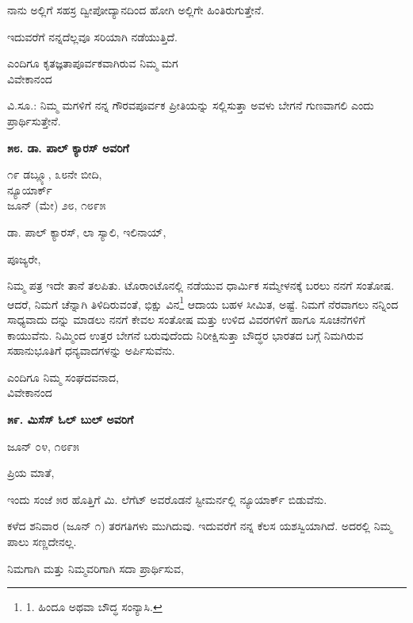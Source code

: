 ನಾನು ಅಲ್ಲಿಗೆ ಸಹಸ್ರ ದ್ವೀಪೋದ್ಯಾನದಿಂದ ಹೋಗಿ ಅಲ್ಲಿಗೇ ಹಿಂತಿರುಗುತ್ತೇನೆ.

ಇದುವರೆಗೆ ನನ್ನದೆಲ್ಲವೂ ಸರಿಯಾಗಿ ನಡೆಯುತ್ತಿದೆ.

\begin{flushright}
ಎಂದಿಗೂ ಕೃತಜ್ಞತಾಪೂರ್ವಕವಾಗಿರುವ ನಿಮ್ಮ ಮಗ\\ವಿವೇಕಾನಂದ
\end{flushright}

ವಿ.ಸೂ.: ನಿಮ್ಮ ಮಗಳಿಗೆ ನನ್ನ ಗೌರವಪೂರ್ವಕ ಪ್ರೀತಿಯನ್ನು ಸಲ್ಲಿಸುತ್ತಾ ಅವಳು ಬೇಗನೆ ಗುಣವಾಗಲಿ ಎಂದು ಪ್ರಾರ್ಥಿಸುತ್ತೇನೆ.

\begin{center}
\textbf{೫೮. ಡಾ. ಪಾಲ್ ಕ್ಯಾರಸ್ ಅವರಿಗೆ}
\end{center}

\begin{flushright}
೧೯ ಡಬ್ಲ್ಯೂ, ೩೮ನೇ ಬೀದಿ,\\ನ್ಯೂಯಾರ್ಕ್\\ಜೂನ್ (ಮೇ) ೨೮, ೧೮೯೫
\end{flushright}

ಡಾ. ಪಾಲ್ ಕ್ಯಾರಸ್, ಲಾ ಸ್ಯಾಲಿ, ಇಲಿನಾಯ್​,

ಪೂಜ್ಯರೇ,

ನಿಮ್ಮ ಪತ್ರ ಇದೇ ತಾನೆ ತಲಪಿತು. ಟೊರಾಂಟೊನಲ್ಲಿ ನಡೆಯುವ ಧಾರ್ಮಿಕ ಸಮ್ಮೇಳನಕ್ಕೆ ಬರಲು ನನಗೆ ಸಂತೋಷ. ಆದರೆ, ನಿಮಗೆ ಚೆನ್ನಾಗಿ ತಿಳಿದಿರುವಂತೆ, ಭಿಕ್ಷು ವಿನ\footnote{1. ಹಿಂದೂ ಅಥವಾ ಬೌದ್ಧ ಸಂನ್ಯಾಸಿ.} ಆದಾಯ ಬಹಳ ಸೀಮಿತ, ಅಷ್ಟೆ. ನಿಮಗೆ ನೆರವಾಗಲು ನನ್ನಿಂದ ಸಾಧ್ಯವಾದು ದನ್ನು ಮಾಡಲು ನನಗೆ ಕೇವಲ ಸಂತೋಷ ಮತ್ತು ಉಳಿದ ವಿವರಗಳಿಗೆ ಹಾಗೂ ಸೂಚನೆಗಳಿಗೆ ಕಾಯುವೆನು. ನಿಮ್ಮಿಂದ ಉತ್ತರ ಬೇಗನೆ ಬರುವುದೆಂದು ನಿರೀಕ್ಷಿಸುತ್ತಾ ಬೌದ್ಧರ ಭಾರತದ ಬಗ್ಗೆ ನಿಮಗಿರುವ ಸಹಾನುಭೂತಿಗೆ ಧನ್ಯವಾದಗಳನ್ನು ಅರ್ಪಿಸುವೆನು.

\begin{flushright}
ಎಂದಿಗೂ ನಿಮ್ಮ ಸಂಘದವನಾದ,\\ವಿವೇಕಾನಂದ
\end{flushright}

\begin{center}
\textbf{೫೯. ಮಿಸೆಸ್ ಓಲ್ ಬುಲ್ ಅವರಿಗೆ}
\end{center}

\begin{flushright}
ಜೂನ್ ೦೪, ೧೮೯೫
\end{flushright}

ಪ್ರಿಯ ಮಾತೆ,

ಇಂದು ಸಂಜೆ ೫ರ ಹೊತ್ತಿಗೆ ಮಿ. ಲೆಗೆಟ್ ಅವರೊಡನೆ ಸ್ಟೀಮರ್ನಲ್ಲಿ ನ್ಯೂಯಾರ್ಕ್ ಬಿಡುವೆನು.

ಕಳೆದ ಶನಿವಾರ (ಜೂನ್ ೧) ತರಗತಿಗಳು ಮುಗಿದುವು. ಇದುವರೆಗೆ ನನ್ನ ಕೆಲಸ ಯಶಸ್ವಿಯಾಗಿದೆ. ಅದರಲ್ಲಿ ನಿಮ್ಮ ಪಾಲು ಸಣ್ಣದೇನಲ್ಲ.

ನಿಮಗಾಗಿ ಮತ್ತು ನಿಮ್ಮವರಿಗಾಗಿ ಸದಾ ಪ್ರಾರ್ಥಿಸುವ,

